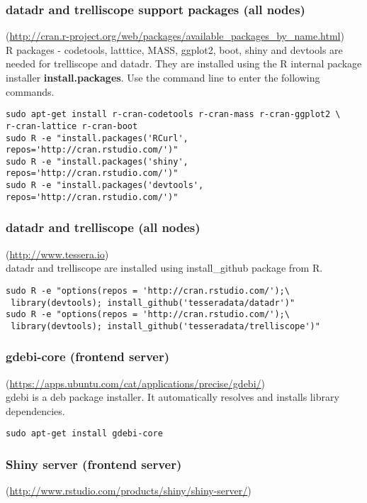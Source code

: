\subsubsection{datadr and trelliscope support packages (all nodes)}(\url{http://cran.r-project.org/web/packages/available\_packages\_by\_name.html})\\
R packages - codetools, latttice, MASS, ggplot2, boot, shiny and devtools are needed for trelliscope and datadr. They are installed using the R internal package installer \textbf{install.packages}. Use the command line to enter the following commands. 
\begin{verbatim}
sudo apt-get install r-cran-codetools r-cran-mass r-cran-ggplot2 \
r-cran-lattice r-cran-boot
sudo R -e "install.packages('RCurl', repos='http://cran.rstudio.com/')"
sudo R -e "install.packages('shiny', repos='http://cran.rstudio.com/')"
sudo R -e "install.packages('devtools', repos='http://cran.rstudio.com/')"
\end{verbatim}

\subsubsection{datadr and trelliscope (all nodes)}(\url{http://www.tessera.io})\\
datadr and trelliscope are installed using install\_github package from R. 
\begin{verbatim}
sudo R -e "options(repos = 'http://cran.rstudio.com/');\
 library(devtools); install_github('tesseradata/datadr')"
sudo R -e "options(repos = 'http://cran.rstudio.com/');\
 library(devtools); install_github('tesseradata/trelliscope')"
\end{verbatim}

\subsubsection{gdebi-core (frontend server)}(\url{https://apps.ubuntu.com/cat/applications/precise/gdebi/})\\
gdebi is a deb package installer. It automatically resolves and installs library dependencies.
\begin{verbatim}
sudo apt-get install gdebi-core
\end{verbatim}

\subsubsection{Shiny server (frontend server)}(\url{http://www.rstudio.com/products/shiny/shiny-server/})\\

